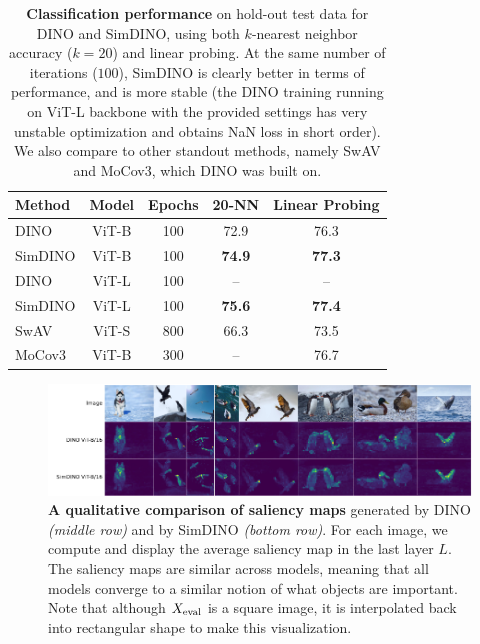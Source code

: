 \documentclass[../../book-main.tex]{subfiles}
\begin{document}
\begin{table}
    \centering
    \begin{tabular}{@{}lcccc@{}} %
        \toprule
        Method & Model & Epochs & 20-NN & Linear Probing 
        \\
        \midrule 
        DINO & ViT-B & 100 & 72.9 & 76.3 \\
        SimDINO & ViT-B & 100 & \bf 74.9 & \bf 77.3 \\
        DINO & ViT-L & 100 & -- & -- \\
        SimDINO & ViT-L & 100 & \bf 75.6 & \bf 77.4 \\
        \midrule
        \color{gray} SwAV & \color{gray} ViT-S & \color{gray} 800 & \color{gray} 66.3 & \color{gray} 73.5 \\
        \color{gray} MoCov3 & \color{gray} ViT-B & \color{gray} 300  & \color{gray} -- & \color{gray} 76.7 \\
        \bottomrule
    \end{tabular}
    \caption{\small\textbf{Classification performance} on hold-out test data for DINO and SimDINO, using both \(k\)-nearest neighbor accuracy (\(k = 20\)) and linear probing. At the same number of iterations (\(100\)), SimDINO is clearly better in terms of performance, and is more stable (the DINO training running on ViT-L backbone with the provided settings has very unstable optimization and obtains NaN loss in short order). We also compare to other standout methods, namely SwAV and MoCov3, which DINO was built on.}
    \label{tab:dino_imagenet_linear_probing}
\end{table}

\begin{figure}
    \centering 
    \includegraphics[width=\textwidth]{figs_chap7/dino_attention_maps.png}
    \caption{\small\textbf{A qualitative comparison of saliency maps} generated by DINO \textit{(middle row)} and by SimDINO \textit{(bottom row)}. For each image, we compute and display the average saliency map in the last layer \(L\). The saliency maps are similar across models, meaning that all models converge to a similar notion of what objects are important. Note that although \(X_{\mathrm{eval}}\) is a square image, it is interpolated back into rectangular shape to make this visualization.}
    \label{fig:dino_attention_maps_saliency}
\end{figure}
\end{document}
